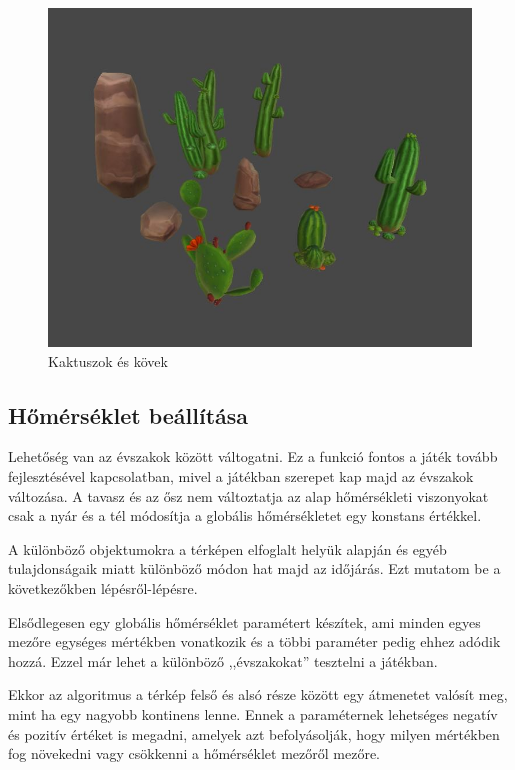 
\begin{figure}[h!]
\centering
\includegraphics[scale=0.4]{kepek/Cactus.JPG}
\caption[Kaktuszok és kövek]{Kaktuszok és kövek \footnotemark} 
\label{fig:Cactus}
\end{figure}


\newpage
\subsection{Hőmérséklet beállítása}

Lehetőség van az évszakok között váltogatni. Ez a funkció fontos a játék tovább fejlesztésével kapcsolatban, mivel a játékban szerepet kap majd az évszakok változása. A tavasz és az ősz nem változtatja az alap hőmérsékleti viszonyokat csak a nyár és a tél módosítja a globális hőmérsékletet egy konstans értékkel. 

A különböző objektumokra a térképen elfoglalt helyük alapján és egyéb tulajdonságaik miatt különböző módon hat majd az időjárás. Ezt mutatom be a következőkben lépésről-lépésre.

Elsődlegesen egy globális hőmérséklet paramétert készítek, ami minden egyes mezőre egységes mértékben vonatkozik és a többi paraméter pedig ehhez adódik hozzá. Ezzel már lehet a különböző ,,évszakokat'' tesztelni a játékban.

Ekkor az algoritmus a térkép felső és alsó része között egy átmenetet valósít meg, mint ha egy nagyobb kontinens lenne. Ennek a paraméternek lehetséges negatív és pozitív értéket is megadni, amelyek azt befolyásolják, hogy milyen mértékben fog növekedni vagy csökkenni a hőmérséklet mezőről mezőre.

